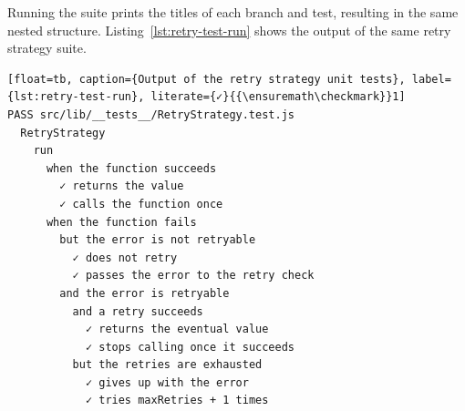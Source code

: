 Running the suite prints the titles of each branch and test, resulting in the same nested structure.
Listing~\ref{lst:retry-test-run} shows the output of the same retry strategy suite.

\begin{lstlisting}[float=tb, caption={Output of the retry strategy unit tests}, label={lst:retry-test-run}, literate={✓}{{\ensuremath\checkmark}}1]
PASS src/lib/__tests__/RetryStrategy.test.js
  RetryStrategy
    run
      when the function succeeds
        ✓ returns the value
        ✓ calls the function once
      when the function fails
        but the error is not retryable
          ✓ does not retry
          ✓ passes the error to the retry check
        and the error is retryable
          and a retry succeeds
            ✓ returns the eventual value
            ✓ stops calling once it succeeds
          but the retries are exhausted
            ✓ gives up with the error
            ✓ tries maxRetries + 1 times
\end{lstlisting}


